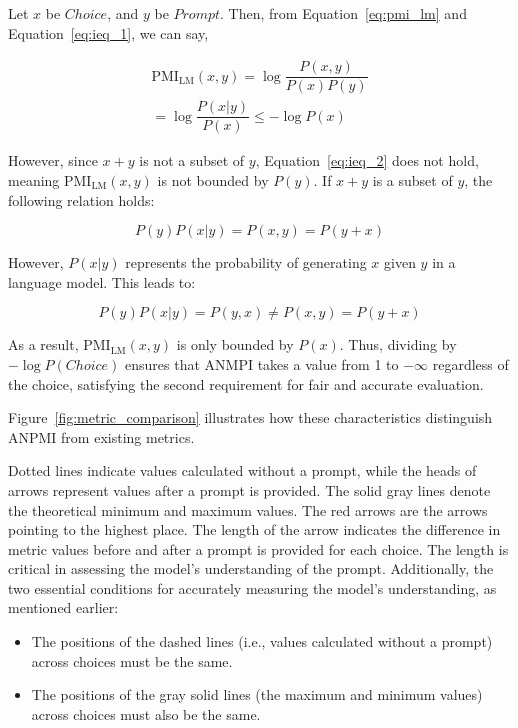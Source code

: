 {Let \hbox{$x$} be \hbox{$Choice$}, and \hbox{$y$} be \hbox{$Prompt$}. Then, from Equation\hbox{~\ref{eq:pmi_lm}} and Equation\hbox{~\ref{eq:ieq_1}}, we can say,}
\begin{small}
\[
\begin{array}{l}
\text{PMI}_{\text{LM}}(x, y) = \log \dfrac{P(x, y)}{P(x) P(y)} \\ 
= \log \dfrac{P(x | y)}{P(x)} \le -\log P(x)
\end{array}
\]
\end{small}
{However, since \hbox{$x+y$} is not a subset of \hbox{$y$}, Equation\hbox{~\ref{eq:ieq_2}} does not hold, meaning \hbox{$\text{PMI}_{\text{LM}}(x, y)$} is not bounded by \hbox{$P(y)$}.} {If \hbox{$x + y$} is a subset of \hbox{$y$}, the following relation holds:}
\begin{small}
\[ P(y)P(x|y)=P(x,y)=P(y+x) \]
\end{small}
{However, \hbox{$P(x|y)$} represents the probability of generating \hbox{$x$} given \hbox{$y$} in a language model. This leads to:}
\begin{small}
\[ P(y) P(x|y) = P(y,x) \neq P(x, y) = P(y+x) \]
\end{small}
{As a result, $\text{PMI}_{\text{LM}}(x, y)$ is only bounded by $P(x)$. Thus, dividing by {\small $-\log  P(Choice)$} ensures that ANMPI takes a value from 1 to {\small $  -\infty$} regardless of the choice, satisfying the second requirement for fair and accurate evaluation. 

Figure\hbox{~\ref{fig:metric_comparison}} illustrates how these characteristics distinguish ANPMI from existing metrics.} 
{Dotted lines indicate values calculated without a prompt, while the heads of arrows represent values after a prompt is provided. The solid gray lines denote the theoretical minimum and maximum values. The red arrows are the arrows pointing to the highest place. The length of the arrow indicates the difference in metric values before and after a prompt is provided for each choice. The length is critical in assessing the model's understanding of the prompt. Additionally, the two essential conditions for accurately measuring the model's understanding, as mentioned earlier:}
\begin{itemize}
\item { The positions of the dashed lines (i.e., values calculated without a prompt) across choices must be the same.}
\item {The positions of the gray solid lines (the maximum and minimum values) across choices must also be the same.}
\end{itemize} 
